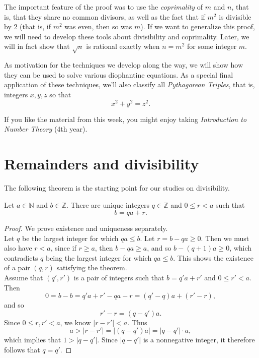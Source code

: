 \documentclass[11pt,dvipsnames]{book}
\numberwithin{figure}{section} %
\numberwithin{table}{section} %
\begin{document}
The important feature of the proof was to use the {\it coprimality} of $m$ and $n$, that is, that they share no common divisors, as well as the fact that if $m^2$ is divisible by $2$ (that is, if $m^2$ was even, then so was $m$). If we want to generalize this proof, we will need to develop  these tools about divisibility and coprimality. Later, we will in fact show that $\sqrt{n}$ is rational exactly when $n=m^2$ for some integer $m$.

As motivation for the techniques we develop along the way, we will show how they can be used to solve various diophantine equations. As a special final application of these techniques, we'll also classify all {\it Pythagorean Triples}, that is, integers $x,y,z$ so that
\[
x^2+y^2=z^2.\]

If you like the material from this week, you might enjoy taking {\it Introduction to Number Theory} (4th year).

\section{Remainders and divisibility }%
\label{remainders}

The following theorem is the starting point for our studies on divisibility.

\begin{theorem}
Let  $a\in\mathbb{N}$ and $b\in\mathbb{Z}$. There are unique integers $q\in \mathbb{Z}$ and $0\leq r<a$ such that
\[
b=qa+r.
\]
\end{theorem}

\begin{proof}
We prove existence and uniqueness separately. \\

 Let $q$ be the largest integer for which $qa\leq b$. Let $r=b-qa\geq 0$. Then we must also have $r<a$, since if $r\geq a$, then $b-qa\geq a$, and so $b-(q+1)a\geq 0$, which contradicts $q$ being the largest integer for which $qa\leq b$. This shows the existence of a pair $(q,r)$ satisfying the theorem. \\

 Assume that $(q',r')$ is a pair of integers such that $b=q'a+r'$ and $0\leq r'<a$.
Then
\[
0=b-b=q'a+r'-qa-r = (q'-q)a+(r'-r),
\]
and so
\[
r'-r=(q-q')a.
\]
Since $0\leq r,r'<a$, we know $|r-r'|<a$. Thus
\[
a>|r-r'|=|(q-q')a|=|q-q'|\cdot a,
\]
which implies that $1>|q-q'|$.
Since $|q-q'|$ is a nonnegative integer, it therefore follows that $q=q'$.
\end{proof}
\end{document}
